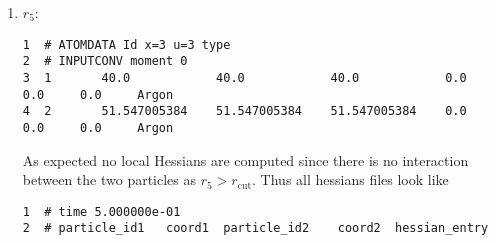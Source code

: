 \documentclass[a4paper]{article}
\begin{document}
\begin{enumerate}
\begin{description}
\end{description}
\item \(r_5\):
\label{sec-1-4-4-6}
\begin{verbatim}
1  # ATOMDATA Id x=3 u=3 type
2  # INPUTCONV moment 0
3  1       40.0            40.0            40.0            0.0     0.0     0.0     Argon
4  2       51.547005384    51.547005384    51.547005384    0.0     0.0     0.0     Argon
\end{verbatim}
As expected no local Hessians are computed since there is no interaction between the two particles as \(r_5 > r_{\textrm{cut}}\).
Thus all hessians files look like
\begin{verbatim}
1  # time 5.000000e-01
2  # particle_id1   coord1  particle_id2    coord2  hessian_entry
\end{verbatim}
\end{enumerate}
\end{document}
